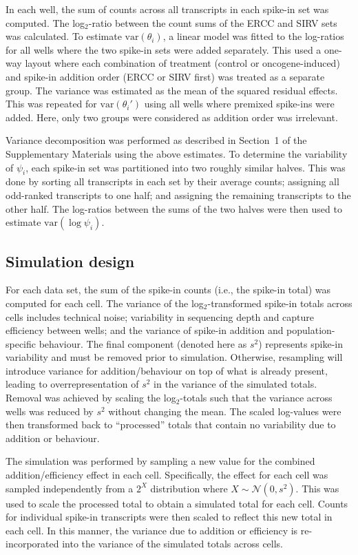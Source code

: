 \documentclass{article}
\begin{document}
In each well, the sum of counts across all transcripts in each spike-in set was computed.
The log$_2$-ratio between the count sums of the ERCC and SIRV sets was calculated.
To estimate $\mbox{var}(\theta_i)$, a linear model was fitted to the log-ratios for all wells where the two spike-in sets were added separately.
This used a one-way layout where each combination of treatment (control or oncogene-induced) and spike-in addition order (ERCC or SIRV first) was treated as a separate group.
The variance was estimated as the mean of the squared residual effects.
This was repeated for $\mbox{var}(\theta_i')$ using all wells where premixed spike-ins were added.
Here, only two groups were considered as addition order was irrelevant.

Variance decomposition was performed as described in Section~1 of the Supplementary Materials using the above estimates.
To determine the variability of $\psi_i$, each spike-in set was partitioned into two roughly similar halves.
This was done by sorting all transcripts in each set by their average counts; assigning all odd-ranked transcripts to one half; and assigning the remaining transcripts to the other half.
The log-ratios between the sums of the two halves were then used to estimate $\mbox{var}(\log \psi_i)$.

\subsection{Simulation design}
For each data set, the sum of the spike-in counts (i.e., the spike-in total) was computed for each cell.
The variance of the log$_2$-transformed spike-in totals across cells includes technical noise; variability in sequencing depth and capture efficiency between wells; and the variance of spike-in addition and population-specific behaviour.
The final component (denoted here as $s^2$) represents spike-in variability and must be removed prior to simulation.
Otherwise, resampling will introduce variance for addition/behaviour on top of what is already present, leading to overrepresentation of $s^2$ in the variance of the simulated totals.
Removal was achieved by scaling the log$_2$-totals such that the variance across wells was reduced by $s^2$ without changing the mean.
The scaled log-values were then transformed back to ``processed'' totals that contain no variability due to addition or behaviour.

The simulation was performed by sampling a new value for the combined addition/efficiency effect in each cell.
Specifically, the effect for each cell was sampled independently from a $2^X$ distribution where $X \sim \mathcal{N}(0, s^2)$.
This was used to scale the processed total to obtain a simulated total for each cell.
Counts for individual spike-in transcripts were then scaled to reflect this new total in each cell.
In this manner, the variance due to addition or efficiency is re-incorporated into the variance of the simulated totals across cells.
\end{document}
